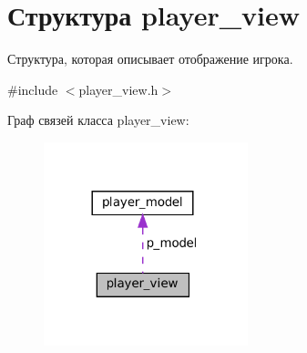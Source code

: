\hypertarget{structplayer__view}{}\section{Структура player\+\_\+view}
\label{structplayer__view}


Структура, которая описывает отображение игрока.  




{\ttfamily \#include $<$player\+\_\+view.\+h$>$}



Граф связей класса player\+\_\+view\+:\nopagebreak
\begin{figure}[H]
\begin{center}
\leavevmode
\includegraphics[width=168pt]{structplayer__view__coll__graph}
\end{center}
\end{figure}
